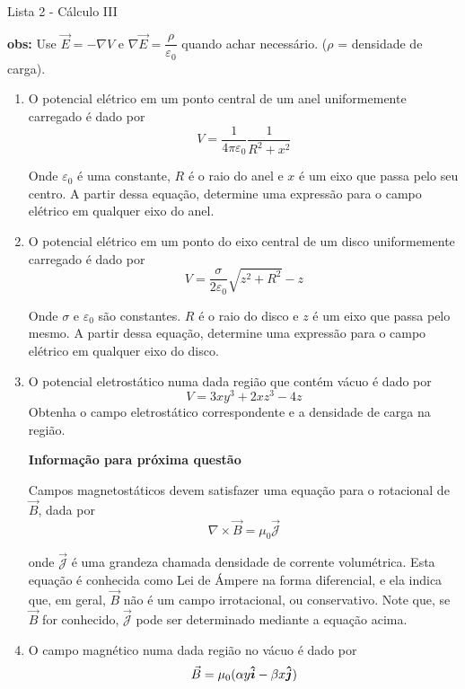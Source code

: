 \documentclass[11pt,a4paper]{article}
\newcommand{\mat}[1]{\mbox{\boldmath{$#1$}}}
\begin{document}
	\begin{center}
		\Large Lista 2 - Cálculo III
	\end{center}
	
	\textbf{obs:} Use $\vec{E} = - \nabla V$ e $\nabla \vec{E} = \displaystyle \dfrac{\rho}		{\varepsilon_0}$ quando achar necessário. ($\rho$ = densidade de carga).

	\begin{enumerate}
	
	\item O potencial elétrico em um ponto central de um anel uniformemente carregado é dado por
	$$V = \displaystyle\dfrac{1}{4 \pi \varepsilon_0} \displaystyle\dfrac{1}{R^2 + x^2}$$
	
	Onde $\varepsilon_0$ é uma constante, $R$ é o raio do anel e $x$ é um eixo que passa pelo seu centro. A partir dessa equação, determine uma expressão para o campo elétrico em qualquer eixo do anel.	
	
	\item O potencial elétrico em um ponto do eixo central de um disco uniformemente carregado é dado por
	$$V = \displaystyle\dfrac{\sigma}{2\varepsilon_0}\sqrt{z^2 + R^2} - z$$
	
	Onde $\sigma$ e $\varepsilon_0$ são constantes. $R$ é o raio do disco e $z$ é um eixo que passa pelo mesmo. A partir dessa equação, determine uma expressão para o campo elétrico em qualquer eixo do disco. 
	
	\item O potencial eletrostático numa dada região que contém vácuo é dado por
	$$V = 3xy^3 + 2xz^3 - 4z$$
	Obtenha o campo eletrostático correspondente e a densidade de carga na região.
	
\textbf{Informação para próxima questão}	
	
	Campos magnetostáticos devem satisfazer uma equação para o rotacional de $\vec{B}$, dada por
	$$\nabla \times \vec{B} = \mu_0 \mathcal{\vec{J}} $$	
	
	onde $\mathcal{\vec{J}}$ é uma grandeza chamada densidade de corrente volumétrica. Esta equação é conhecida como Lei de Ámpere na forma diferencial, e ela indica que, em geral, $\vec{B}$ não é um campo irrotacional, ou conservativo. Note que, se $\vec{B}$ for conhecido, $\mathcal{\vec{J}}$ pode ser determinado mediante a equação acima.
	
	\item O campo magnético numa dada região no vácuo é dado por 
	$$\vec{B} = \mu_0(\alpha y \mat{\hat{i}} - \beta x \mat{\hat{j}})$$
	

\end{enumerate}
\end{document}
